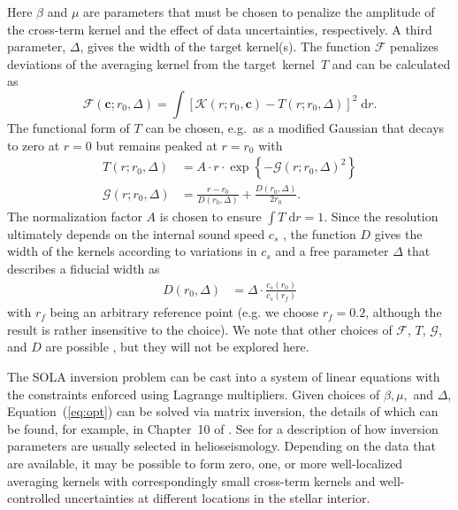 Here $\beta$ and $\mu$ are parameters that must be chosen to penalize the amplitude of the cross-term kernel and the effect of data uncertainties, respectively. 
A third parameter, $\Delta$, gives the width of the target kernel(s). 
The function $\mathscr{F}$ penalizes deviations of the averaging kernel from the target~kernel~$T$ and can be calculated as
\begin{equation}
        \mathscr{F}(\mathbf c; r_0, \Delta)
        =  
        \int \left[ \mathscr{K}(r; r_0, \mathbf c) - T(r; r_0, \Delta) \right]^2 \; \text{d}r. 
\end{equation}
The functional form of $T$ can be chosen, e.g.~as a modified Gaussian that decays to zero at ${r=0}$ but remains peaked at ${r=r_0}$ \citep[e.g.][]{1999MNRAS.309...35R} with 
\begin{align}
    T(r; r_0, \Delta) &= A\cdot r\cdot \exp\left\{-\mathcal{G}(r; r_0, \Delta)^2\right\} \\
    \mathcal{G}(r; r_0, \Delta) &= \frac{r-r_0}{D(r_0, \Delta)} + \frac{D(r_0, \Delta)}{2 r_0}.
\end{align}
The normalization factor $A$ is chosen to ensure ${\int T \; \text{d}r = 1}$. 
Since the resolution ultimately depends on the internal sound speed $c_s$ \citep[][]{1993ASPC...42..141T}, the function $D$ gives the width of the kernels according to variations in $c_s$ and a free parameter $\Delta$ that describes a fiducial width as 
\begin{align}
    D(r_0, \Delta) &= \Delta \cdot \frac{c_s(r_0)}{c_s(r_f)} 
\end{align}
with $r_f$ being an arbitrary reference point (e.g. we choose ${r_f=0.2}$, although the result is rather insensitive to the choice). 
We note that other choices of $\mathscr{F}$, $T$, $\mathcal{G}$, and $D$ are possible \citep[see, e.g.,][]{1985SoPh..100...65G, 1989ApJ...343..526B}, but they will not be explored here. 

The SOLA inversion problem can be cast into a system of linear equations with the constraints enforced using Lagrange multipliers. 
Given choices of $\beta, \mu,$ and $\Delta$, Equation~(\ref{eq:opt}) can be solved via matrix inversion, the details of which can be found, for example, in Chapter~10 of \citealt{basuchaplin2017}. 
See \citet{1999MNRAS.309...35R} for a description of how inversion parameters are usually selected in helioseismology. 
Depending on the data that are available, it may be possible to form zero, one, or more well-localized averaging kernels with correspondingly small cross-term kernels and well-controlled uncertainties at different locations in the stellar interior. 



